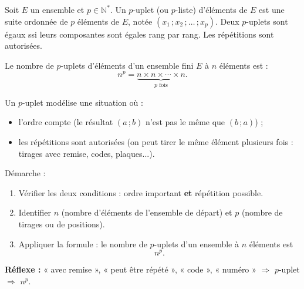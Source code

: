 \documentclass[11pt]{article}
\newcommand{\cle}[1]{{\popxbold\color{popdark}#1}}
\newcounter{popsec}
\newcounter{popsub}
\newcommand{\courssub}[1]{%
  \stepcounter{popsub}%
  \par\vspace{9pt}\noindent{\popxbold\fontsize{11.5}{13}\selectfont\color{popink}{\color{poporange}\thepopsec.\thepopsub}\hspace{6pt}#1}\par\nopagebreak\vspace{4pt}
}
\begin{document}
\courssub{p-uplets (p-listes)}

\begin{definition}
Soit $E$ un ensemble et $p\in\mathbb{N}^*$. Un \cle{$p$-uplet} (ou \cle{$p$-liste}) d'éléments de $E$ est une suite ordonnée de $p$ éléments de $E$, notée $(x_1\,;x_2\,;\dots\,;x_p)$. Deux $p$-uplets sont égaux ssi leurs composantes sont égales rang par rang. Les répétitions sont autorisées.
\end{definition}

\begin{propriete}
Le nombre de $p$-uplets d'éléments d'un ensemble fini $E$ à $n$ éléments est :
\[ n^p = \underbrace{n\times n\times\cdots\times n}_{p \text{ fois}}. \]
\end{propriete}

\begin{methode}
Un \cle{$p$-uplet} modélise une situation où :
\begin{itemize}
\item l'\cle{ordre compte} (le résultat $(a\,;b)$ n'est pas le même que $(b\,;a)$) ;
\item les \cle{répétitions sont autorisées} (on peut tirer le même élément plusieurs fois : tirages avec remise, codes, plaques...).
\end{itemize}
Démarche :
\begin{enumerate}
\item Vérifier les deux conditions : ordre important \textbf{et} répétition possible.
\item Identifier $n$ (nombre d'éléments de l'ensemble de départ) et $p$ (nombre de tirages ou de positions).
\item Appliquer la formule : le nombre de $p$-uplets d'un ensemble à $n$ éléments est
\[ n^p. \]
\end{enumerate}
\textbf{Réflexe :} « avec remise », « peut être répété », « code », « numéro » $\Rightarrow$ $p$-uplet $\Rightarrow$ $n^p$.
\end{methode}
\end{document}
